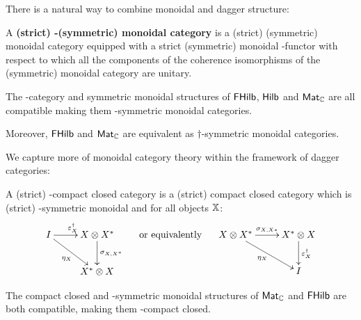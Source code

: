 There is a natural way to combine monoidal and dagger structure:
\begin{definition}
A {\bf  (strict) \dag-(symmetric) monoidal category} is a (strict) (symmetric) monoidal category equipped with a strict (symmetric) monoidal \dag-functor with respect to which all the components of the  coherence isomorphisms of the (symmetric) monoidal category are unitary.
\end{definition}
\begin{example}
The \dag-category and symmetric monoidal structures of $\mathsf{FHilb}$, $\mathsf{Hilb}$ and $\mathsf{Mat}_{\mathbb{C}}$ are all compatible making them \dag-symmetric monoidal categories.

Moreover, $\mathsf{FHilb}$ and $\mathsf{Mat}_{\mathbb{C}}$  are equivalent as $\dag$-symmetric monoidal categories.
\end{example}
We capture more of monoidal category theory within the framework of dagger categories:
\begin{definition}
A {(strict) \dag-compact closed category} is a (strict) compact closed category which is (strict) \dag-symmetric monoidal and for all objects $\mathbb{X}$:
$$
\xymatrix{
I \ar[r]^{\epsilon_X^\dag} \ar[dr]_{\eta_X}   &  X\otimes X^* \ar[d]^{\sigma_{X,X^*}}\\
 &  X^* \otimes X 
}
\hspace*{.5cm}
\text{or equivalently}
\hspace*{.5cm}
\xymatrix{
X\otimes X^* \ar[dr]_{\eta_X} \ar[r]^{\sigma_{X,X*}}
 & X^* \otimes X  \ar[d]^{\epsilon_X^\dag}\\
& I
}
$$
\end{definition}
\begin{example}
The compact closed and \dag-symmetric monoidal structures of $\mathsf{Mat}_{\mathbb{C}}$ and $\mathsf{FHilb}$ are both compatible, making them \dag-compact closed.
\end{example}
